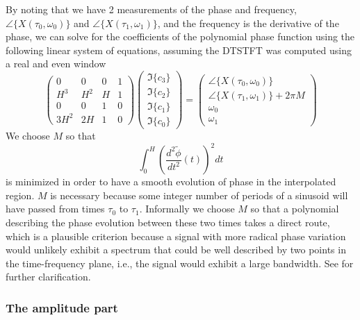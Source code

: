 By noting that we have 2 measurements of the phase and frequency,
$\angle\{X(\tau_0,\omega_0)\}$ and $\angle\{X(\tau_1,\omega_1)\}$, and the frequency
is the derivative of the phase, we can solve for the coefficients of the
polynomial phase function using the following linear system of equations,
assuming the DTSTFT was computed using a real and even window
\[
    \begin{pmatrix}
        0   & 0     & 0 & 1 \\
        H^3 & H^2   & H & 1 \\
        0   & 0     & 1 & 0 \\
        3 H^2 & 2 H & 1 & 0
    \end{pmatrix}
    \begin{pmatrix}
        \Im\{c_3\} \\
        \Im\{c_2\} \\
        \Im\{c_1\} \\
        \Im\{c_0\}
    \end{pmatrix}
    =
    \begin{pmatrix}
        \angle\{X(\tau_0,\omega_0)\} \\
        \angle\{X(\tau_1,\omega_1)\} + 2 \pi M \\
        \omega_0 \\
        \omega_1        
    \end{pmatrix}
\]
We choose $M$ so that
\begin{equation}
    \label{eq:minfmmq}
    \int_{0}^{H}(\frac{d^{2}\tilde{\phi}}{dt^2}(t))^{2}dt
\end{equation}
is minimized in order to have a smooth evolution of phase in the interpolated
region. $M$ is necessary because some integer number of periods of a sinusoid
will have passed from times $\tau_{0}$ to $\tau_{1}$. Informally we choose $M$
so that a polynomial describing the phase evolution between these two times
takes a direct route, which is a plausible criterion because a signal with more
radical phase variation would unlikely exhibit a spectrum that could be well
described by two points in the time-frequency plane, i.e., the signal
would exhibit a large bandwidth. See \cite[p.~751]{mcaulay1986speech} for
further clarification.

\subsubsection{The amplitude part}

